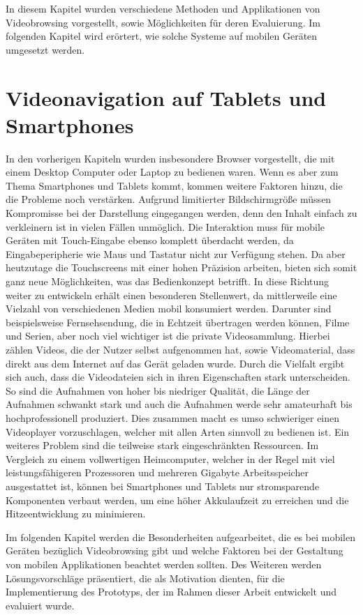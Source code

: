 \documentclass[11pt,a4paper]{report}
\begin{document}
In diesem Kapitel wurden verschiedene Methoden und Applikationen von Videobrowsing vorgestellt, sowie Möglichkeiten für deren Evaluierung. Im folgenden Kapitel wird erörtert, wie solche Systeme auf mobilen Geräten umgesetzt werden.

\chapter{Videonavigation auf Tablets und Smartphones}

In den vorherigen Kapiteln wurden insbesondere Browser vorgestellt, die mit einem Desktop Computer oder Laptop zu bedienen waren. Wenn es aber zum Thema Smartphones und Tablets kommt, kommen weitere Faktoren hinzu, die die Probleme noch verstärken. Aufgrund limitierter Bildschirmgröße müssen Kompromisse bei der Darstellung eingegangen werden, denn den Inhalt einfach zu verkleinern ist in vielen Fällen unmöglich. Die Interaktion muss für mobile Geräten mit Touch-Eingabe ebenso komplett überdacht werden, da Eingabeperipherie wie Maus und Tastatur nicht zur Verfügung stehen. Da aber heutzutage die Touchscreens mit einer hohen Präzision arbeiten, bieten sich somit ganz neue Möglichkeiten, was das Bedienkonzept betrifft. In diese Richtung weiter zu entwickeln erhält einen besonderen Stellenwert, da mittlerweile eine Vielzahl von verschiedenen Medien mobil konsumiert werden. Darunter sind beispielsweise Fernsehsendung, die in Echtzeit übertragen werden können, Filme und Serien, aber noch viel wichtiger ist die private Videosammlung. Hierbei zählen Videos, die der Nutzer selbst aufgenommen hat, sowie Videomaterial, dass direkt aus dem Internet auf das Gerät geladen wurde. Durch die Vielfalt ergibt sich auch, dass die Videodateien sich in ihren Eigenschaften stark unterscheiden. So sind die Aufnahmen von hoher bis niedriger Qualität, die Länge der Aufnahmen schwankt stark und auch die Aufnahmen werde sehr amateurhaft bis hochprofessionell produziert. Dies zusammen macht es umso schwieriger einen Videoplayer vorzuschlagen, welcher mit allen Arten sinnvoll zu bedienen ist. Ein weiteres Problem sind die teilweise stark eingeschränkten Ressourcen. Im Vergleich zu einem vollwertigen Heimcomputer, welcher in der Regel mit viel leistungsfähigeren Prozessoren und mehreren Gigabyte Arbeitsspeicher ausgestattet ist, können bei Smartphones und Tablets nur stromsparende Komponenten verbaut werden, um eine höher Akkulaufzeit zu erreichen und die Hitzeentwicklung zu minimieren. \cite{hurst2007interactive}

Im folgenden Kapitel werden die Besonderheiten aufgearbeitet, die es bei mobilen Geräten bezüglich Videobrowsing gibt und welche Faktoren bei der Gestaltung von mobilen Applikationen beachtet werden sollten. Des Weiteren werden Lösungsvorschläge präsentiert, die als Motivation dienten, für die Implementierung des Prototyps, der im Rahmen dieser Arbeit entwickelt und evaluiert wurde.
\end{document}
